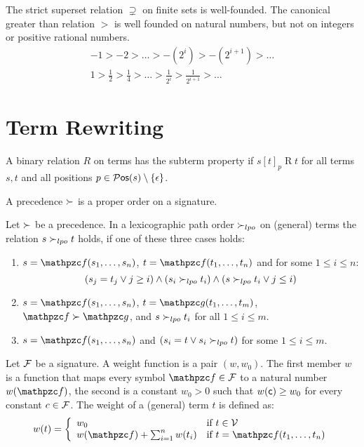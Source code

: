 \begin{example}
	The strict superset relation $\supsetneq$ on finite sets is well-founded.
	The canonical greater than relation $>$ is well founded on natural numbers,
	but not on integers or positive rational numbers.
	\begin{gather*}
	-1 > -2 > \ldots > -(2^i) > -(2^{i+1}) > \ldots\\
	1 > \frac{1}{2} > \frac{1}{4} > \ldots > \frac{1}{2^i} > \frac{1}{2^{i+1}} > \ldots
	\end{gather*}
\end{example}

\section{Term Rewriting}

\begin{definition}
	A binary relation $R$ on terms has the {\myem subterm property} if 
	$s[t]_p\mathbin{R}t$ for all terms $s,t$ and all positions $p\in\operatorname{\mathcal{P}\mathsf{os}}(s) \setminus \{\epsilon\}$.
\end{definition}

\begin{definition}\label{def:prec}
	A {\myem precedence} $\succ$ is a proper order 
	on a signature.
\end{definition}

\begin{definition}[LPO]\label{def:lpo}
	Let $\succ$ be a precedence. In a {\myem lexicographic path order} $\succ_{lpo}$ on (general) terms the relation $s\succ_{lpo} t$ holds,
	if one of these three cases holds:
	\begin{enumerate}
		\item $s=\mcf(s_1,\ldots,s_n)$, $t=\mcf(t_1,\ldots,t_n)$ and for some $1\leq i\leq n$:
		\[
		(s_j=t_j\lor j\geq i) \land (s_i\succ_{lpo} t_i) \land (s\succ_{lpo} t_i \lor j\leq i)
		\]
		\item $s=\mcf(s_1,\ldots,s_n)$, $t=\mcg(t_1,\ldots,t_m)$, $\mcf\gtpre\mcg$, and $s\succ_{lpo} t_i$ for all $1\leq i\leq m$.
		\item $s=\mcf(s_1,\ldots,s_n)$ and $(s_i=t \lor s_i\succ_{lpo} t)$ for some $1\leq i\leq m$.
	\end{enumerate}
\end{definition}

\begin{definition}\label{def:weight}
	Let ${\mathcal F}$ be a signature.
	A {\myem weight function} is a pair $(w,w_0)$. 
	The first member $w$ is a function that maps every symbol $\mcf\in\mcF$ to a natural number $w(\mcf)$,
	the second is a constant $w_0>0$ such that $w({\mathsf c})\geq w_0$ for every constant $c\in{\mathcal F}$. 
	The weight of a (general) term $t$ is defined as:
	\begin{gather*}
	w(t) = \left\{ \begin{array}{ll} 
	w_0 & \text{if } t\in\mcV\\
	w(\mcf)+\sum_{i=1}^n w(t_i) & \text{if }t=\mcf(t_1,\ldots,t_n)
	\end{array}\right.
	\end{gather*}
\end{definition}

